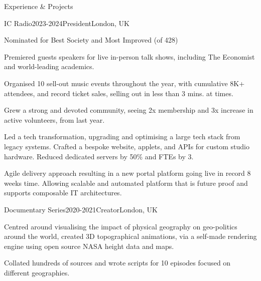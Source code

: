 \documentclass{resume} %
\begin{document}
\begin{rSection}{Experience \& Projects}
\begin{rSubsection}{IC Radio}{2023-2024}{President}{London, UK}
    \item Nominated for Best Society and Most Improved (of 428)
    \item Premiered guests speakers for live in-person talk shows, including The Economist and world-leading academics.
    \item Organised 10 sell-out music events throughout the year, with cumulative 8K+ attendees, and record ticket sales, selling out in less than 3 mins. at times.
    \item Grew a strong and devoted community, seeing 2x membership and 3x increase in active volunteers, from last year.
    \item Led a tech transformation, upgrading and optimising a large tech stack from legacy systems. Crafted a bespoke website, applets, and APIs for custom studio hardware. Reduced dedicated servers by 50\% and FTEs by 3.
    \item Agile delivery approach resulting in a new portal platform going live in record 8 weeks time. Allowing scalable and automated platform that is future proof and supports composable IT architectures.
\end{rSubsection}

\begin{rSubsection}{Documentary Series}{2020-2021}{Creator}{London, UK}
\item Centred around visualising the impact of physical geography on geo-politics around the world, created 3D topographical animations, via a self-made rendering engine using open source NASA height data and maps.
\item Collated hundreds of sources and wrote scripts for 10 episodes focused on different geographies.
\end{rSubsection}



\end{rSection}
\end{document}
